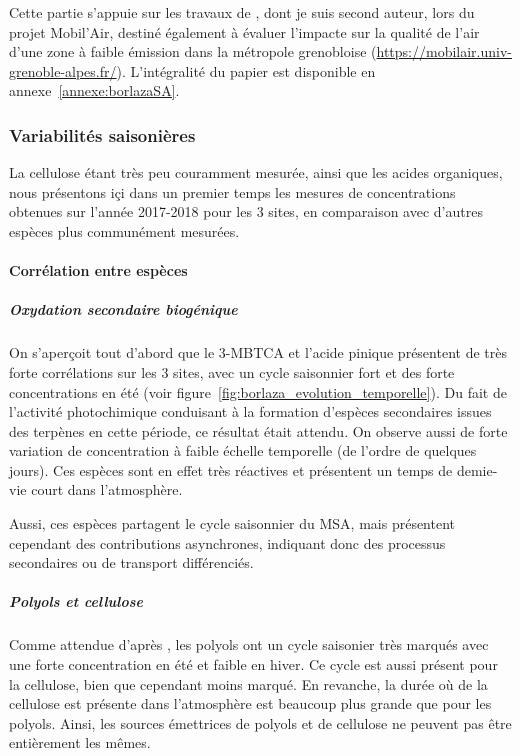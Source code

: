 \begin{tcolorbox}[colback=red!5!white,colframe=Melon,title=Note]
    Cette partie s'appuie sur les travaux de \cite{borlazaFinescaleinprep.}, dont je suis
    second auteur, lors du projet Mobil'Air, destiné également à évaluer l'impacte sur la
    qualité de l'air d'une zone à faible émission dans la métropole grenobloise 
    (\url{https://mobilair.univ-grenoble-alpes.fr/}).
    L'intégralité du papier est disponible en annexe~\ref{annexe:borlazaSA}.
\end{tcolorbox}

\subsubsection{Variabilités saisonières}%
\label{ssub:variabilites_saisonières}

La cellulose étant très peu couramment mesurée, ainsi que les acides organiques, nous
présentons içi dans un premier temps les mesures de concentrations obtenues sur l'année
2017-2018 pour les 3 sites, en comparaison avec d'autres espèces plus communément
mesurées.

\paragraph{Corrélation entre espèces}%
\label{par:correlation_entre_especes}

\subparagraph{Oxydation secondaire biogénique}%
\label{par:oxydation_secondaire_biogénique}

On s'aperçoit tout d'abord que le 3-MBTCA et l'acide pinique présentent de très forte
corrélations sur les 3 sites, avec un cycle saisonnier fort et des forte concentrations
en été (voir figure~\ref{fig:borlaza_evolution_temporelle}). Du fait de l'activité
photochimique conduisant à la formation d'espèces secondaires issues des terpènes en
cette période, ce résultat était attendu. On observe aussi de forte variation de
concentration à faible échelle temporelle (de l'ordre de quelques jours). Ces espèces
sont en effet très réactives et présentent un temps de demie-vie court dans l'atmosphère.

Aussi, ces espèces partagent le cycle saisonnier du MSA, mais présentent cependant des
contributions asynchrones, indiquant donc des processus secondaires ou de transport
différenciés.

\subparagraph{Polyols et cellulose}%
\label{par:oxydation_secondaire_anthrophique}

Comme attendue d'après \cite{samakePolyols2019}, les polyols ont un cycle saisonier très
marqués avec une forte concentration en été et faible en hiver. Ce cycle est aussi
présent pour la cellulose, bien que cependant moins marqué. En revanche, la durée où de
la cellulose est présente dans l'atmosphère est beaucoup plus grande que pour les
polyols.  Ainsi, les sources émettrices de polyols et de cellulose ne peuvent pas être
entièrement les mêmes.

